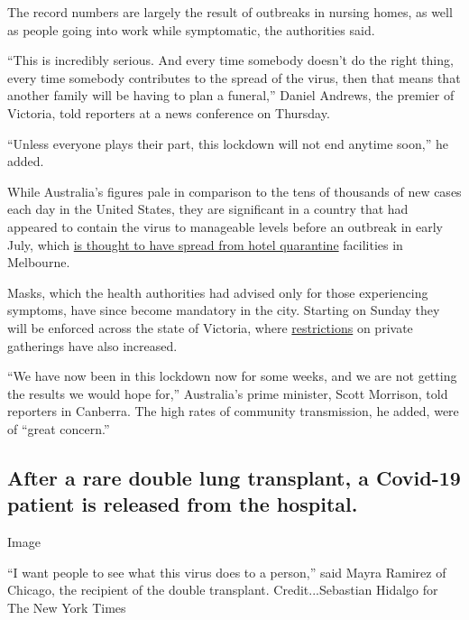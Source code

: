 The record numbers are largely the result of outbreaks in nursing homes,
as well as people going into work while symptomatic, the authorities
said.

``This is incredibly serious. And every time somebody doesn't do the
right thing, every time somebody contributes to the spread of the virus,
then that means that another family will be having to plan a funeral,''
Daniel Andrews, the premier of Victoria, told reporters at a news
conference on Thursday.

``Unless everyone plays their part, this lockdown will not end anytime
soon,'' he added.

While Australia's figures pale in comparison to the tens of thousands of
new cases each day in the United States, they are significant in a
country that had appeared to contain the virus to manageable levels
before an outbreak in early July, which
\href{https://www.nytimes3xbfgragh.onion/2020/07/02/world/australia/melbourne-coronavirus-outbreak.html}{is
thought to have spread from hotel quarantine} facilities in Melbourne.

Masks, which the health authorities had advised only for those
experiencing symptoms, have since become mandatory in the city. Starting
on Sunday they will be enforced across the state of Victoria, where
\href{https://www.nytimes3xbfgragh.onion/2020/07/17/world/australia/melbourne-lockdown-readers.html}{restrictions}
on private gatherings have also increased.

``We have now been in this lockdown now for some weeks, and we are not
getting the results we would hope for,'' Australia's prime minister,
Scott Morrison, told reporters in Canberra. The high rates of community
transmission, he added, were of ``great concern.''

\hypertarget{after-a-rare-double-lung-transplant-a-covid-19-patient-is-released-from-the-hospital}{%
\subsection{After a rare double lung transplant, a Covid-19 patient is
released from the
hospital.}\label{after-a-rare-double-lung-transplant-a-covid-19-patient-is-released-from-the-hospital}}

Image

``I want people to see what this virus does to a person,'' said Mayra
Ramirez of Chicago, the recipient of the double transplant.
Credit...Sebastian Hidalgo for The New York Times

